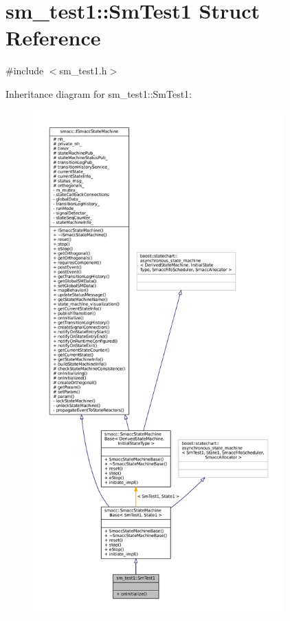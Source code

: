 \hypertarget{structsm__test1_1_1SmTest1}{}\section{sm\+\_\+test1\+:\+:Sm\+Test1 Struct Reference}
\label{structsm__test1_1_1SmTest1}


{\ttfamily \#include $<$sm\+\_\+test1.\+h$>$}



Inheritance diagram for sm\+\_\+test1\+:\+:Sm\+Test1\+:
\nopagebreak
\begin{figure}[H]
\begin{center}
\leavevmode
\includegraphics[height=550pt]{structsm__test1_1_1SmTest1__inherit__graph}
\end{center}
\end{figure}



